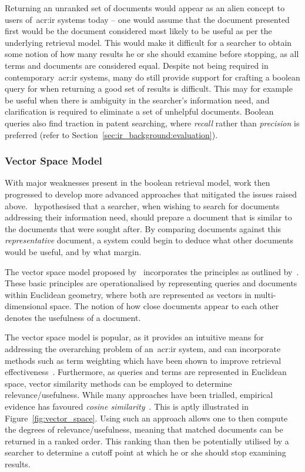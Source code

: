 Returning an unranked set of documents would appear as an alien concept to users of~\gls{acr:ir} systems today -- one would assume that the document presented first would be the document considered most likely to be useful as per the underlying retrieval model. This would make it difficult for a searcher to obtain some notion of how many results he or she should examine before stopping, as all terms and documents are considered equal. Despite not being required in contemporary~\gls{acr:ir} systems, many do still provide support for crafting a boolean query for when returning a good set of results is difficult. This may for example be useful when there is ambiguity in the searcher's information need, and clarification is required to eliminate a set of unhelpful documents. Boolean queries also find traction in patent searching, where \emph{recall} rather than \emph{precision} is preferred (refer to Section~\ref{sec:ir_background:evaluation}).

\subsubsection{Vector Space Model}
With major weaknesses present in the boolean retrieval model, work then progressed to develop more advanced approaches that mitigated the issues raised above.~\cite{luhn1957ranking_query} hypothesised that a searcher, when wishing to search for documents addressing their information need, should prepare a document that is similar to the documents that were sought after. By comparing documents against this \emph{representative} document, a system could begin to deduce what other documents would be useful, and by what margin.

The vector space model proposed by~\cite{salton1975vsm} incorporates the principles as outlined by~\cite{luhn1957ranking_query}. These basic principles are operationalised by representing queries and documents within Euclidean geometry, where both are represented as vectors in multi-dimensional space. The notion of how close documents appear to each other denotes the usefulness of a document.

The vector space model is popular, as it provides an intuitive means for addressing the overarching problem of an~\gls{acr:ir} system, and can incorporate methods such as term weighting which have been shown to improve retrieval effectiveness~\citep{croft2010search}. Furthermore, as queries and terms are represented in Euclidean space, vector similarity methods can be employed to determine relevance/usefulness. While many approaches have been trialled, empirical evidence has favoured \emph{cosine similarity}~\citep{croft2010search}. This is aptly illustrated in Figure~\ref{fig:vector_space}. Using such an approach allows one to then compute the degrees of relevance/usefulness, meaning that matched documents can be returned in a ranked order. This ranking than then be potentially utilised by a searcher to determine a cutoff point at which he or she should stop examining results.

